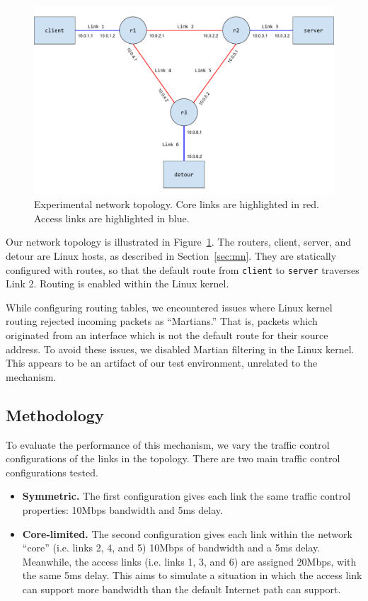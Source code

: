 \documentclass{cwru}
\begin{document}
\begin{figure}[htbp]
  \centering
  \includegraphics[width=\textwidth]{figures/Topology.pdf}
  \caption[Experimental network topology]{Experimental network topology. Core
    links are highlighted in red. Access links are highlighted in blue.}
  \label{fig:topo}
\end{figure}

Our network topology is illustrated in Figure~\ref{fig:topo}. The routers,
client, server, and detour are Linux hosts, as described in
Section~\ref{sec:mn}. They are statically configured with routes, so that the
default route from \texttt{client} to \texttt{server} traverses Link 2. Routing
is enabled within the Linux kernel.

While configuring routing tables, we encountered issues where Linux kernel
routing rejected incoming packets as ``Martians.'' That is, packets which
originated from an interface which is not the default route for their source
address. To avoid these issues, we disabled Martian filtering in the Linux
kernel. This appears to be an artifact of our test environment, unrelated to the
mechanism.

\subsection{Methodology}

To evaluate the performance of this mechanism, we vary the traffic control
configurations of the links in the topology. There are two main traffic control
configurations tested.

\begin{itemize}
\item \textbf{Symmetric.} The first configuration gives each link the same
  traffic control properties: 10Mbps bandwidth and 5ms delay.
\item \textbf{Core-limited.} The second configuration gives each link within the
  network ``core'' (i.e. links 2, 4, and 5) 10Mbps of bandwidth and a 5ms delay.
  Meanwhile, the access links (i.e. links 1, 3, and 6) are assigned 20Mbps, with
  the same 5ms delay. This aims to simulate a situation in which the access link
  can support more bandwidth than the default Internet path can support.
\end{itemize}
\end{document}

